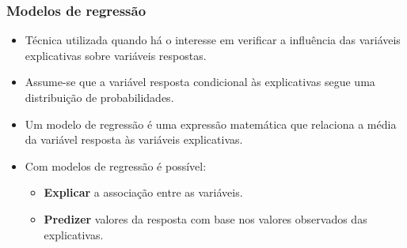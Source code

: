 \documentclass[10pt,
  aspectratio=169,
  serif,
  mathserif,
  professionalfont,
  compress,
  handout,
  ]{beamer}\usepackage[]{graphicx}\usepackage[]{color}
\begin{document}
\begin{frame}
  \frametitle{Modelos de regressão}
  
  \begin{itemize}
  
  \itemsep 2ex
  
  \item Técnica utilizada quando há o interesse em verificar a influência das variáveis explicativas sobre variáveis respostas.
  
  \item Assume-se que a variável resposta condicional às explicativas segue uma distribuição de probabilidades. 
  
  \item Um modelo de regressão é uma expressão matemática que relaciona a média da variável resposta às variáveis explicativas.

  \item Com modelos de regressão é possível:
  
  \begin{itemize}
    \item \textbf{Explicar} a associação entre as variáveis.
    \item \textbf{Predizer} valores da resposta com base nos valores observados das explicativas. 
  \end{itemize}

\end{itemize}

\end{frame}

\end{document}
